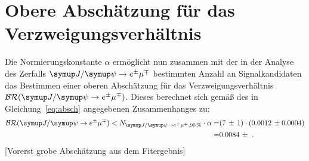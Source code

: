 \section{Obere Abschätzung für das Verzweigungsverhältnis}
Die Normierungskonstante $\alpha$ ermöglicht nun zusammen mit der in der Analyse des Zerfalls $\signal$ bestimmten Anzahl an Signalkandidaten das Bestimmen einer oberen Abschätzung für das Verzweigungsverhältnis $\mathcal{BR}(\signal)$. Dieses berechnet sich gemäß des in Gleichung~\eqref{eq:absch} angegebenen Zusammenhanges zu:
%
\begin{equation}
  \begin{split}
    \mathcal{BR}(\signal)<N_{\signal, \SI{95}{\percent}}\cdot\alpha=& (7\,\pm\,1)\cdot(0.0012\,\pm0.0004)\\=& 0.0084\,\pm\, \, .
  \end{split}
\end{equation}
%
[Vorerst grobe Abschätzung aus dem Fitergebnis]

\nocite{biblatex, make, toolbox, gitbash, siunitx}
